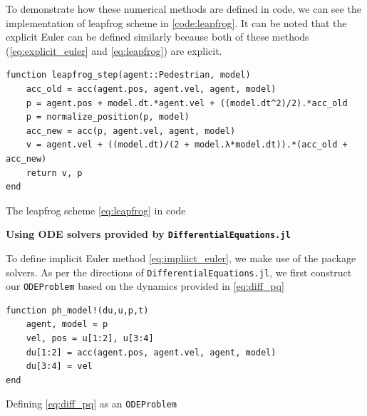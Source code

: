 To demonstrate how these numerical methods are defined in code, we can see the implementation of leapfrog scheme in \autoref{code:leapfrog}. It can be noted that the explicit Euler can be defined similarly because both of these methods (\autoref{eq:explicit_euler} and \autoref{eq:leapfrog}) are explicit.

\begin{listing}[H]
\begin{verbatim}    
function leapfrog_step(agent::Pedestrian, model)
    acc_old = acc(agent.pos, agent.vel, agent, model)
    p = agent.pos + model.dt.*agent.vel + ((model.dt^2)/2).*acc_old
    p = normalize_position(p, model)
    acc_new = acc(p, agent.vel, agent, model)
    v = agent.vel + ((model.dt)/(2 + model.λ*model.dt)).*(acc_old + acc_new)
    return v, p
end 
\end{verbatim}
\caption{The leapfrog scheme \autoref{eq:leapfrog} in code}
\label{code:leapfrog}
\end{listing}


\textbf{Using ODE solvers provided by \texttt{DifferentialEquations.jl}}

To define implicit Euler method \autoref{eq:impliict_euler}, we make use of the package solvers. As per the directions of \texttt{DifferentialEquations.jl}, we first construct our \texttt{ODEProblem} based on the dynamics provided in \autoref{eq:diff_pq}
\begin{listing}[H]
\begin{verbatim}    
function ph_model!(du,u,p,t)
    agent, model = p
    vel, pos = u[1:2], u[3:4]
    du[1:2] = acc(agent.pos, agent.vel, agent, model)
    du[3:4] = vel
end
\end{verbatim}
\caption{Defining \autoref{eq:diff_pq} as an \texttt{ODEProblem}}
\label{code:ph_prob}
\end{listing}


